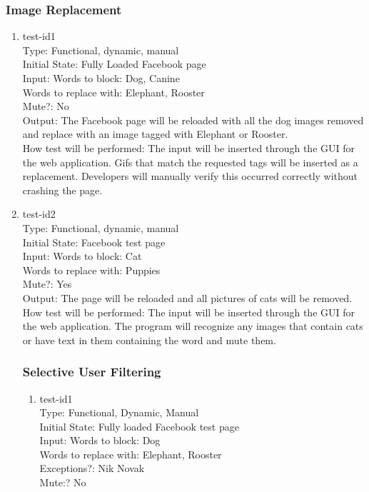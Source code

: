\documentclass[12pt, titlepage]{article}
\begin{document}
\subsubsection{Image Replacement}
\begin{enumerate}
\item{test-id1\\}
Type: Functional, dynamic, manual\\
					
Initial State: Fully Loaded Facebook page \\
					
Input: Words to block: Dog, Canine \\
Words to replace with: Elephant, Rooster  \\
Mute?: No \\
					
Output: The Facebook page will be reloaded with all the dog images removed and replace with an image tagged with Elephant or Rooster. \\
					
How test will be performed: The input will be inserted through the GUI for the web application. Gifs that match the requested tags will be inserted as a replacement. Developers will manually verify this occurred correctly without crashing the page.
					
\item{test-id2\\}
Type: Functional, dynamic, manual \\
					
Initial State: Facebook test page \\
					
Input:  Words to block: Cat \\
Words to replace with: Puppies \\
Mute?: Yes \\
					
Output: The page will be reloaded and all pictures of cats will be removed.\\

How test will be performed: The input will be inserted through the GUI for the web application. The program will recognize any images that contain cats or have text in them containing the word and mute them.
\subsubsection{Selective User Filtering}
\begin{enumerate}
\item{test-id1\\}
Type: Functional, Dynamic, Manual \\			
Initial State: Fully loaded Facebook test page \\		
Input: Words to block: Dog \\
Words to replace with: Elephant, Rooster \\
Exceptions?: Nik Novak \\
Mute:? No \\
					

\end{enumerate}
\end{enumerate}
\end{document}
